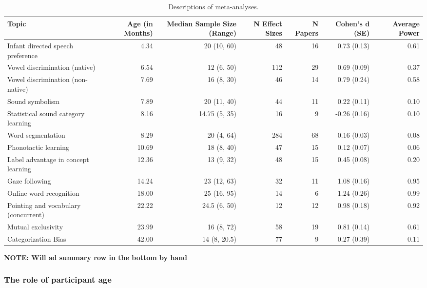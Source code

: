 \documentclass[english,floatsintext,man]{apa6}
\begin{document}
\begin{table}[tbp]
\begin{center}
\begin{threeparttable}
\caption{Descriptions of meta-analyses.}
\begin{tabular}{lrrrrrr}
\toprule
Topic & Age (in Months) & Median Sample Size (Range) & N Effect Sizes & N Papers & Cohen's d (SE) & Average Power\\
\midrule
Infant directed speech preference & 4.34 & 20 (10, 60) & 48 & 16 & 0.73 (0.13) & 0.61\\
Vowel discrimination (native) & 6.54 & 12 (6, 50) & 112 & 29 & 0.69 (0.09) & 0.37\\
Vowel discrimination (non-native) & 7.69 & 16 (8, 30) & 46 & 14 & 0.79 (0.24) & 0.58\\
Sound symbolism & 7.89 & 20 (11, 40) & 44 & 11 & 0.22 (0.11) & 0.10\\
Statistical sound category learning & 8.16 & 14.75 (5, 35) & 16 & 9 & -0.26 (0.16) & 0.10\\
Word segmentation & 8.29 & 20 (4, 64) & 284 & 68 & 0.16 (0.03) & 0.08\\
Phonotactic learning & 10.69 & 18 (8, 40) & 47 & 15 & 0.12 (0.07) & 0.06\\
Label advantage in concept learning & 12.36 & 13 (9, 32) & 48 & 15 & 0.45 (0.08) & 0.20\\
Gaze following & 14.24 & 23 (12, 63) & 32 & 11 & 1.08 (0.16) & 0.95\\
Online word recognition & 18.00 & 25 (16, 95) & 14 & 6 & 1.24 (0.26) & 0.99\\
Pointing and vocabulary (concurrent) & 22.22 & 24.5 (6, 50) & 12 & 12 & 0.98 (0.18) & 0.92\\
Mutual exclusivity & 23.99 & 16 (8, 72) & 58 & 19 & 0.81 (0.14) & 0.61\\
Categorization Bias & 42.00 & 14 (8, 20.5) & 77 & 9 & 0.27 (0.39) & 0.11\\
\bottomrule
\end{tabular}
\end{threeparttable}
\end{center}
\end{table}

\textbf{NOTE: Will ad summary row in the bottom by hand}

\subsubsection{The role of participant
age}\label{the-role-of-participant-age}
\end{document}
